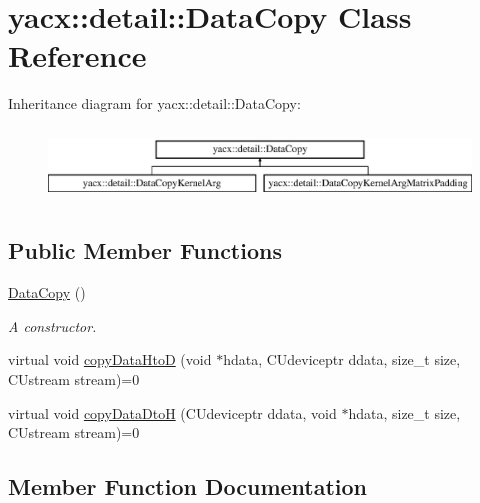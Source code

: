 \hypertarget{classyacx_1_1detail_1_1_data_copy}{}\section{yacx\+:\+:detail\+:\+:Data\+Copy Class Reference}
\label{classyacx_1_1detail_1_1_data_copy}
Inheritance diagram for yacx\+:\+:detail\+:\+:Data\+Copy\+:\begin{figure}[H]
\begin{center}
\leavevmode
\includegraphics[height=1.971831cm]{classyacx_1_1detail_1_1_data_copy}
\end{center}
\end{figure}
\subsection*{Public Member Functions}
\begin{DoxyCompactItemize}
\item 
\mbox{\label{classyacx_1_1detail_1_1_data_copy_aec6fe17c8a22b1ad61cb2f1a45f96591}} 
\hyperlink{classyacx_1_1detail_1_1_data_copy_aec6fe17c8a22b1ad61cb2f1a45f96591}{Data\+Copy} ()
\begin{DoxyCompactList}\small\item\em A constructor. \end{DoxyCompactList}\item 
virtual void \hyperlink{classyacx_1_1detail_1_1_data_copy_ad528786c51783257b292a06a6dde1c4e}{copy\+Data\+HtoD} (void $\ast$hdata, C\+Udeviceptr ddata, size\+\_\+t size, C\+Ustream stream)=0
\item 
virtual void \hyperlink{classyacx_1_1detail_1_1_data_copy_ab97df2d6bec15f8247a5da0ff8bd05ff}{copy\+Data\+DtoH} (C\+Udeviceptr ddata, void $\ast$hdata, size\+\_\+t size, C\+Ustream stream)=0
\end{DoxyCompactItemize}


\subsection{Member Function Documentation}
\mbox{\label{classyacx_1_1detail_1_1_data_copy_ab97df2d6bec15f8247a5da0ff8bd05ff}} 
